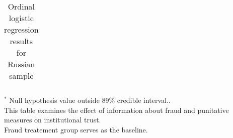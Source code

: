 \begin{table}[h]
\begin{center}
\begin{threeparttable}
\begin{tabular}{l c c c c c c}
\hline
\end{tabular}
\begin{tablenotes}[flushleft]
\scriptsize{$^*$ Null hypothesis value outside 89\% credible interval..  \\
This table examines the effect of information about fraud
                      and punitative measures on institutional trust. \\
Fraud treatement group serves as the baseline.}
\end{tablenotes}
\end{threeparttable}
\caption{Ordinal logistic regression results for Russian sample}
\label{table:coefficients}
\end{center}
\end{table}
